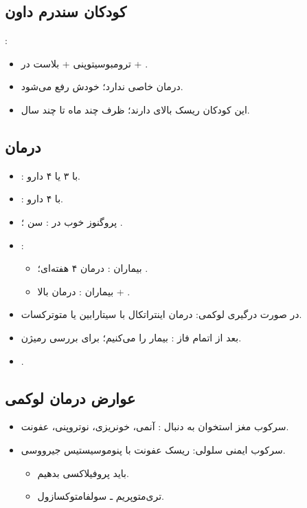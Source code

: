 \documentclass[12pt,a4paper]{article}
\begin{document}
\subsection*{کودکان سندرم داون}
:
\begin{itemize}
\item ترومبوسیتوپنی + بلاست در  + .
\item درمان خاصی ندارد؛ خودش رفع می‌شود.
\item این کودکان ریسک بالای  دارند؛ ظرف چند ماه تا چند سال.
\end{itemize}

\subsection*{درمان}
\begin{itemize}
\item {}:  با ۳ یا ۴ دارو.
\item {}:  با ۴ دارو.
\item پروگنوز خوب در : سن ؛ .
\item {}:
  \begin{itemize}
  \item بیماران : درمان ۴ هفته‌ای؛ .
  \item بیماران : درمان بالا + .
  \end{itemize}
\item در صورت درگیری  لوکمی: درمان اینتراتکال با سیتارابین یا متوترکسات.
\item بعد از اتمام فاز : بیمار را  می‌کنیم؛ برای بررسی رمیژن.
\item {}.
\end{itemize}

\subsection*{عوارض درمان لوکمی}
\begin{itemize}
\item سرکوب مغز استخوان به دنبال : آنمی، خونریزی، نوتروپنی، عفونت.
\item سرکوب ایمنی سلولی: ریسک عفونت با پنوموسیستیس جیرووسی.
  \begin{itemize}
  \item باید پروفیلاکسی  بدهیم.
  \item تری‌متوپریم ـ سولفامتوکسازول.
  \end{itemize}
\end{itemize}
\end{document}
